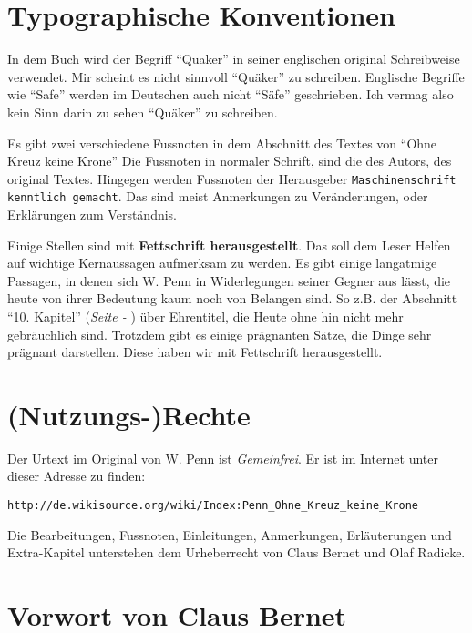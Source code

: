 \chapter{Typographische Konventionen}

In dem Buch wird der Begriff "`Quaker"'  in seiner
englischen original Schreibweise verwendet. Mir scheint es nicht sinnvoll
"`Quäker"' zu schreiben. Englische Begriffe wie "`Safe"' werden im Deutschen
auch nicht "`Säfe"' geschrieben. Ich vermag also kein Sinn darin zu sehen
"`Quäker"' zu schreiben.

\medskip

Es gibt zwei verschiedene Fussnoten in dem Abschnitt des Textes von "`Ohne Kreuz
keine Krone"' Die Fussnoten in normaler Schrift, sind die des Autors, des
original Textes. Hingegen werden Fussnoten der Herausgeber
\texttt{Maschinenschrift kenntlich gemacht}. Das sind meist Anmerkungen zu
Veränderungen, oder Erklärungen zum Verständnis.

\medskip

Einige Stellen sind mit \textbf{Fettschrift herausgestellt}. Das soll dem Leser
Helfen auf wichtige Kernaussagen aufmerksam zu werden. Es gibt einige langatmige
Passagen, in denen sich W. Penn in Widerlegungen seiner Gegner aus lässt, die
heute von ihrer Bedeutung kaum noch von Belangen sind. So z.B. der Abschnitt
"`10. Kapitel"' (\textit{Seite \pageref{kap10} - \pageref{kap10_ende}}) über
Ehrentitel, die Heute ohne hin nicht mehr gebräuchlich sind. Trotzdem gibt es
einige prägnanten Sätze, die Dinge sehr prägnant darstellen. Diese haben wir mit
Fettschrift herausgestellt.

\chapter{(Nutzungs-)Rechte}
Der Urtext im Original von W. Penn ist \textit{Gemeinfrei}. Er ist im Internet
unter dieser Adresse zu finden:

\begin{center}
\texttt{http://de.wikisource.org/wiki/Index:Penn\_Ohne\_Kreuz\_keine\_Krone}
\end{center}

Die Bearbeitungen, Fussnoten, Einleitungen, Anmerkungen, Erläuterungen und
Extra-Kapitel unterstehen dem Urheberrecht von Claus Bernet und Olaf Radicke.

\chapter{Vorwort von Claus Bernet}


